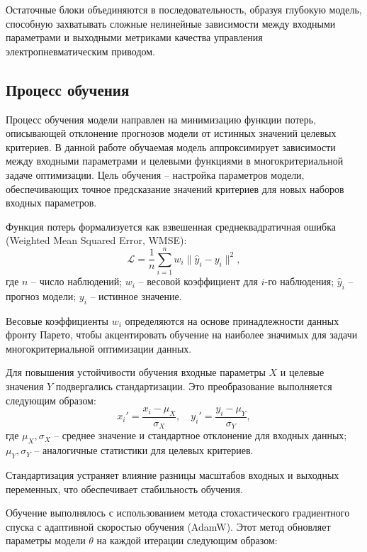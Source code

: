 Остаточные блоки объединяются в последовательность, образуя глубокую модель, способную
захватывать сложные нелинейные зависимости между входными параметрами и выходными метриками
качества управления электропневматическим приводом.

\subsection{Процесс обучения}\label{sec:ch4/sec4/subsec2}

Процесс обучения модели направлен на минимизацию функции потерь,
описывающей отклонение прогнозов модели от истинных значений целевых критериев.
В данной работе обучаемая модель аппроксимирует зависимости между входными
параметрами и целевыми функциями в многокритериальной задаче оптимизации.
Цель обучения -- настройка параметров модели, обеспечивающих точное предсказание
значений критериев для новых наборов входных параметров.

Функция потерь формализуется как взвешенная среднеквадратичная ошибка (Weighted Mean Squared Error, WMSE):
\begin{equation}
\mathcal{L} = \frac{1}{n} \sum_{i=1}^n w_i \| \hat{y}_i - y_i \|^2,
\end{equation}
где $n$ -- число наблюдений;
$w_i$ -- весовой коэффициент для $i$-го наблюдения;
$\hat{y}_i$ -- прогноз модели;
$y_i$ -- истинное значение. 

Весовые коэффициенты $w_i$ определяются на основе принадлежности
данных фронту Парето, чтобы акцентировать обучение на наиболее значимых
для задачи многокритериальной оптимизации данных.

Для повышения устойчивости обучения входные параметры $X$ и целевые
значения $Y$ подвергались стандартизации. Это преобразование выполняется следующим образом:
\begin{equation*}
x_i' = \frac{x_i - \mu_X}{\sigma_X}, \quad y_i' = \frac{y_i - \mu_Y}{\sigma_Y},
\end{equation*}
где $\mu_X, \sigma_X$ -- среднее значение и стандартное отклонение для входных данных;
$\mu_Y, \sigma_Y$ -- аналогичные статистики для целевых критериев. 

Стандартизация устраняет влияние разницы масштабов входных и выходных переменных, что обеспечивает стабильность обучения.

Обучение выполнялось с использованием метода стохастического градиентного спуска
с адаптивной скоростью обучения (AdamW). Этот метод обновляет параметры модели $\theta$ на каждой итерации следующим образом:

